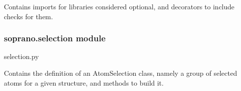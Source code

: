 \documentclass[letterpaper,10pt,english]{sphinxmanual}
\begin{document}
Contains imports for libraries considered optional, and decorators to include
checks for them.

\begin{fulllineitems}
\label{doctree/soprano.optional:soprano.optional.requireNetworkX}
\end{fulllineitems}


\begin{fulllineitems}
\label{doctree/soprano.optional:soprano.optional.requireScikitLearn}
\end{fulllineitems}


\begin{fulllineitems}
\label{doctree/soprano.optional:soprano.optional.requireSpglib}
\end{fulllineitems}



\subsubsection{soprano.selection module}
\label{doctree/soprano.selection:module-soprano.selection}\label{doctree/soprano.selection::doc}\label{doctree/soprano.selection:soprano-selection-module}
selection.py

Contains the definition of an AtomSelection class,
namely a group of selected atoms for a given structure,
and methods to build it.
\end{document}
